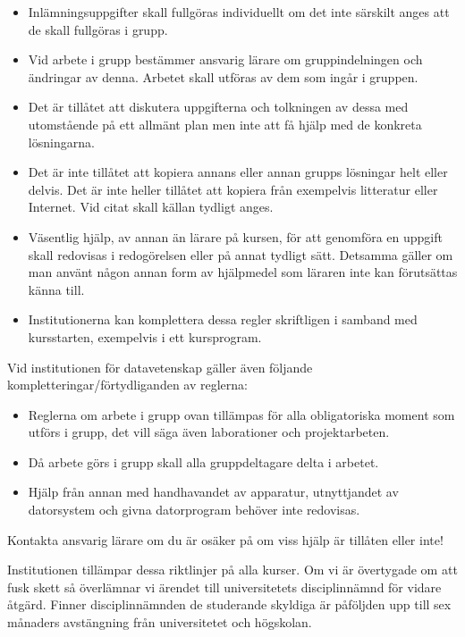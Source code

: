 \documentclass[fleqn, article, a4paper]{memoir}
\begin{document}
\begin{itemize}\tightlist
	\item Inlämningsuppgifter skall fullgöras individuellt om det inte särskilt anges att de skall fullgöras i grupp.
	\item Vid arbete i grupp bestämmer ansvarig lärare om gruppindelningen och ändringar av denna. Arbetet skall utföras av dem som ingår i gruppen.
	\item Det är tillåtet att diskutera uppgifterna och tolkningen av dessa med utomstående på ett allmänt plan men inte att få hjälp med de konkreta lösningarna.
	\item Det är inte tillåtet att kopiera annans eller annan grupps lösningar helt eller delvis. Det är inte heller tillåtet att kopiera från exempelvis litteratur eller Internet. Vid citat skall källan tydligt anges.
	\item Väsentlig hjälp, av annan än lärare på kursen, för att genomföra en uppgift skall redovisas i redogörelsen eller på annat tydligt sätt. Detsamma gäller om man använt någon annan form av hjälpmedel som läraren inte kan förutsättas känna till.
	\item Institutionerna kan komplettera dessa regler skriftligen i samband med kursstarten, exempelvis i ett kursprogram.
\end{itemize}

\n Vid institutionen för datavetenskap gäller även följande kompletteringar/förtydliganden av reglerna:

\begin{itemize}\tightlist
	\item Reglerna om arbete i grupp ovan tillämpas för alla obligatoriska moment som utförs i grupp, det vill säga även laborationer och projektarbeten.
	\item Då arbete görs i grupp skall alla gruppdeltagare delta i arbetet.
	\item Hjälp från annan med handhavandet av apparatur, utnyttjandet av datorsystem och givna datorprogram behöver inte redovisas.
\end{itemize}

\n Kontakta ansvarig lärare om du är osäker på om viss hjälp är tillåten eller inte!

\blankline
\n Institutionen tillämpar dessa riktlinjer på alla kurser. Om vi är övertygade om att fusk skett så överlämnar vi ärendet till universitetets disciplinnämnd för vidare åtgärd. Finner disciplinnämnden de studerande skyldiga är påföljden upp till sex månaders avstängning från universitetet och högskolan.
\end{document}
